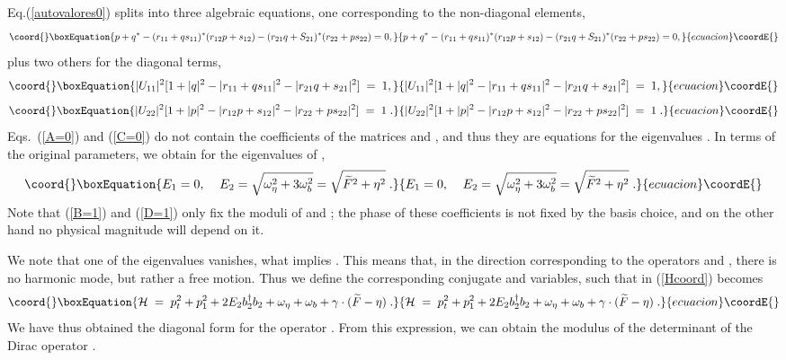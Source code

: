 \documentclass[a4paper,12pt]{article}
\providecommand{\Fd}{\widetilde{F}}
\providecommand{\n}{\eta}
\providecommand{\w}{\omega}
\begin{document}
Eq.(\ref{autovalores0}) splits into three algebraic equations, one
corresponding to the non-diagonal elements,
\begin{equation}\coord{}\boxEquation{\label{C=0}
p+q^*-(r_{11}+q s_{11})^*(r_{12}p+s_{12})-(r_{21}q+
S_{21})^*(r_{22}+p s_{22})=0,
}{p+q^*-(r_{11}+q s_{11})^*(r_{12}p+s_{12})-(r_{21}q+
S_{21})^*(r_{22}+p s_{22})=0,
}{ecuacion}\coordE{}\end{equation}
plus two others for the diagonal terms,
\begin{equation}\coord{}\boxEquation{\label{B=1} 
|U_{11}|^2[1+|q|^2-|r_{11}+q s_{11}|^2-|r_{21}q+s_{21}|^2]\;=\;1,
}{|U_{11}|^2[1+|q|^2-|r_{11}+q s_{11}|^2-|r_{21}q+s_{21}|^2]\;=\;1,
}{ecuacion}\coordE{}\end{equation}
\begin{equation}\coord{}\boxEquation{\label{D=1}
|U_{22}|^2[1+|p|^2-|r_{12}p+ s_{12}|^2-|r_{22}+p s_{22}|^2]\;=\;1\;.
}{|U_{22}|^2[1+|p|^2-|r_{12}p+ s_{12}|^2-|r_{22}+p s_{22}|^2]\;=\;1\;.
}{ecuacion}\coordE{}\end{equation}
Eqs.~(\ref{A=0}) and (\ref{C=0}) do not contain the coefficients of
the matrices \coordHE{} and \coordHE{}, and thus they are equations for the
eigenvalues \coordHE{}.  In terms of the original parameters, we obtain for
the eigenvalues of \coordHE{},
\begin{equation}\coord{}\boxEquation{
E_1=0,\;\;\;\; E_2=\sqrt{\w_\n^2+3\w_b^2}=\sqrt{\Fd^2+\n^2}\;.
}{
E_1=0,\;\;\;\; E_2=\sqrt{\w_\n^2+3\w_b^2}=\sqrt{\Fd^2+\n^2}\;.
}{ecuacion}\coordE{}\end{equation}
Note that (\ref{B=1}) and (\ref{D=1}) only fix the moduli of \coordHE{}
and \coordHE{}; the phase of these coefficients is not fixed by the
basis choice, and on the other hand no physical magnitude will depend
on it.

We note that one of the eigenvalues vanishes, what implies
\coordHE{}. This means that, in the direction corresponding to the
operators \coordHE{} and \coordHE{}, there is no harmonic mode, but rather a
free motion. Thus we define the corresponding conjugate \coordHE{} and
\coordHE{} variables, such that \coordHE{} in (\ref{Hcoord}) becomes
\begin{equation}\coord{}\boxEquation{\label{Hdiag}
{\mathcal H}\;=\; p_t^2 + p_1^2 + 2 E_2 b_2^\dagger b_2 + \w_\n + \w_b + \gamma \cdot (\Fd-\n)\;.
}{{\mathcal H}\;=\; p_t^2 + p_1^2 + 2 E_2 b_2^\dagger b_2 + \w_\n + \w_b + \gamma \cdot (\Fd-\n)\;.
}{ecuacion}\coordE{}\end{equation}
We have thus obtained the diagonal form for the operator
\coordHE{}.  From this expression, we can obtain the modulus of the
determinant of the Dirac operator \coordHE{}.
\end{document}
